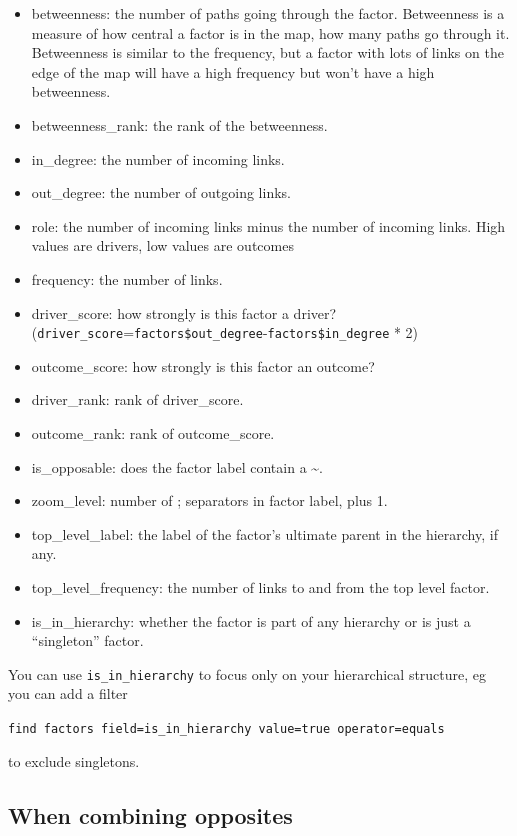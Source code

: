 \documentclass[
]{book}
\providecommand{\tightlist}{%
  \setlength{\itemsep}{0pt}\setlength{\parskip}{0pt}}
\begin{document}
\begin{itemize}
\tightlist
\item
  betweenness: the number of paths going through the factor. Betweenness is a measure of how central a factor is in the map, how many paths go through it. Betweenness is similar to the frequency, but a factor with lots of links on the edge of the map will have a high frequency but won't have a high betweenness.
\item
  betweenness\_rank: the rank of the betweenness.
\item
  in\_degree: the number of incoming links.
\item
  out\_degree: the number of outgoing links.
\item
  role: the number of incoming links minus the number of incoming links. High values are drivers, low values are outcomes
\item
  frequency: the number of links.
\item
  driver\_score: how strongly is this factor a driver? (\texttt{driver\_score}=\texttt{factors\$out\_degree}-\texttt{factors\$in\_degree} * 2)
\item
  outcome\_score: how strongly is this factor an outcome?
\item
  driver\_rank: rank of driver\_score.
\item
  outcome\_rank: rank of outcome\_score.
\item
  is\_opposable: does the factor label contain a \textasciitilde.
\item
  zoom\_level: number of ; separators in factor label, plus 1.
\item
  top\_level\_label: the label of the factor's ultimate parent in the hierarchy, if any.
\item
  top\_level\_frequency: the number of links to and from the top level factor.
\item
  is\_in\_hierarchy: whether the factor is part of any hierarchy or is just a ``singleton'' factor.
\end{itemize}

You can use \texttt{is\_in\_hierarchy} to focus only on your hierarchical structure, eg you can add a filter

\texttt{find\ factors\ field=is\_in\_hierarchy\ value=true\ operator=equals}

to exclude singletons.

\hypertarget{when-combining-opposites}{%
\subsection{When combining opposites}\label{when-combining-opposites}}
\end{document}
